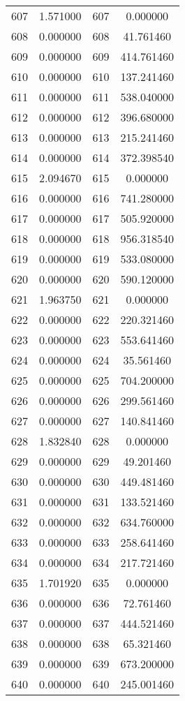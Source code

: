 \documentclass[12pt]{article}
\begin{document}
\begin{longtable}{@{}cccc@{}}
607 & 1.571000 & 607 & 0.000000 \\
608 & 0.000000 & 608 & 41.761460 \\
609 & 0.000000 & 609 & 414.761460 \\
610 & 0.000000 & 610 & 137.241460 \\
611 & 0.000000 & 611 & 538.040000 \\
612 & 0.000000 & 612 & 396.680000 \\
613 & 0.000000 & 613 & 215.241460 \\
614 & 0.000000 & 614 & 372.398540 \\
615 & 2.094670 & 615 & 0.000000 \\
616 & 0.000000 & 616 & 741.280000 \\
617 & 0.000000 & 617 & 505.920000 \\
618 & 0.000000 & 618 & 956.318540 \\
619 & 0.000000 & 619 & 533.080000 \\
620 & 0.000000 & 620 & 590.120000 \\
621 & 1.963750 & 621 & 0.000000 \\
622 & 0.000000 & 622 & 220.321460 \\
623 & 0.000000 & 623 & 553.641460 \\
624 & 0.000000 & 624 & 35.561460 \\
625 & 0.000000 & 625 & 704.200000 \\
626 & 0.000000 & 626 & 299.561460 \\
627 & 0.000000 & 627 & 140.841460 \\
628 & 1.832840 & 628 & 0.000000 \\
629 & 0.000000 & 629 & 49.201460 \\
630 & 0.000000 & 630 & 449.481460 \\
631 & 0.000000 & 631 & 133.521460 \\
632 & 0.000000 & 632 & 634.760000 \\
633 & 0.000000 & 633 & 258.641460 \\
634 & 0.000000 & 634 & 217.721460 \\
635 & 1.701920 & 635 & 0.000000 \\
636 & 0.000000 & 636 & 72.761460 \\
637 & 0.000000 & 637 & 444.521460 \\
638 & 0.000000 & 638 & 65.321460 \\
639 & 0.000000 & 639 & 673.200000 \\
640 & 0.000000 & 640 & 245.001460 \\

\end{longtable}
\end{document}
